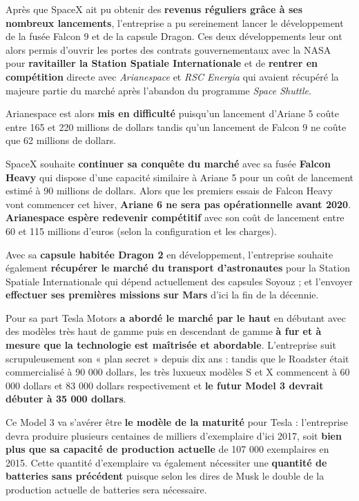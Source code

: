 Après que SpaceX ait pu obtenir des \textbf{revenus réguliers grâce à ses nombreux lancements}, l'entreprise a pu sereinement lancer le développement de la fusée Falcon 9 et de la capsule Dragon. Ces deux développements leur ont alors permis d'ouvrir les portes des contrats gouvernementaux avec la NASA pour \textbf{ravitailler la Station Spatiale Internationale} et de \textbf{rentrer en compétition} directe avec \textit{Arianespace} et \textit{RSC Energia} qui avaient récupéré la majeure partie du marché après l'abandon du programme \textit{Space Shuttle}.

Arianespace est alors \textbf{mis en difficulté} puisqu'un lancement d'Ariane 5 coûte entre 165 et 220 millions de dollars\supercite{Ariane5Cost} tandis qu'un lancement de Falcon 9 ne coûte que 62 millions de dollars\supercite{FalconCost}. 

SpaceX souhaite \textbf{continuer sa conquête du marché} avec sa fusée \textbf{Falcon Heavy} qui dispose d'une capacité similaire à Ariane 5 pour un coût de lancement estimé à 90 millions de dollars. Alors que les premiers essais de Falcon Heavy vont commencer cet hiver\supercite{FalconHeavyFirstLaunch}, \textbf{Ariane 6 ne sera pas opérationnelle avant 2020}\supercite{Ariane6Debuts}. \textbf{Arianespace espère redevenir compétitif} avec son coût de lancement entre 60 et 115 millions d'euros (selon la configuration et les charges)\supercite{Ariane6Cost}.

Avec sa \textbf{capsule habitée Dragon 2} en développement, l'entreprise souhaite également \textbf{récupérer le marché du transport d'astronautes} pour la Station Spatiale Internationale qui dépend actuellement des capsules Soyouz ; et l'envoyer \textbf{effectuer ses premières missions sur Mars} d'ici la fin de la décennie\supercite{ElonMuskMars2020}.

\vspace{5mm}

Pour sa part Tesla Motors \textbf{a abordé le marché par le haut} en débutant avec des modèles très haut de gamme puis en descendant de gamme \textbf{à fur et à mesure que la technologie est maîtrisée et abordable}. L'entreprise suit scrupuleusement son « plan secret »\supercite{TeslaSecretMasterPlan} depuis dix ans : tandis que le Roadster était commercialisé à 90 000 dollars, les très luxueux modèles S et X commencent à 60 000 dollars et 83 000 dollars respectivement et \textbf{le futur Model 3 devrait débuter à 35 000 dollars}.

Ce Model 3 va s'avérer être \textbf{le modèle de la maturité} pour Tesla : l'entreprise devra produire plusieurs centaines de milliers d'exemplaire d'ici 2017, soit \textbf{bien plus que sa capacité de production actuelle} de 107 000 exemplaires en 2015\supercite{Tesla2015FullYearUpdate}. Cette quantité d'exemplaire va également nécessiter une \textbf{quantité de batteries sans précédent} puisque selon les dires de Musk\supercite{Model3Unveil} le double de la production actuelle de batteries sera nécessaire.

